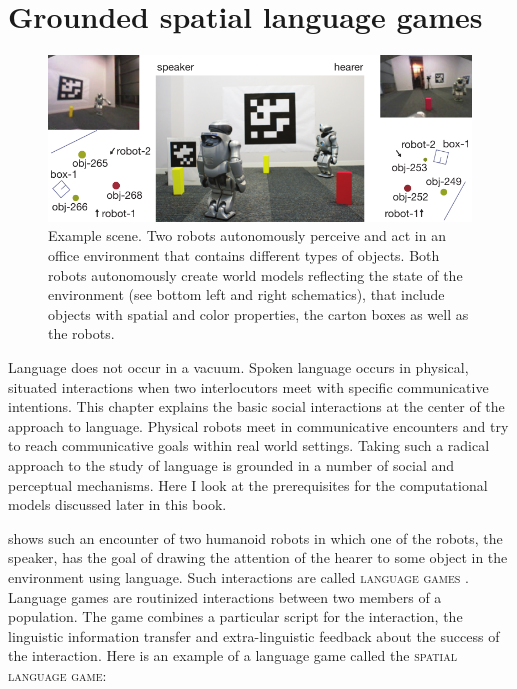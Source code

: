 %


\chapter{Grounded spatial language games}
\label{s:spatial-language-games}
\begin{figure}
\begin{center}
\includegraphics[width=1.0\columnwidth]{figs/space-scene-2-small}
\end{center}
\caption[Example spatial setup]{Example scene. 
Two robots autonomously perceive and act in an office 
environment that contains different types of objects. Both 
robots autonomously create world models reflecting the state 
of the environment (see bottom left and right schematics), that 
include objects with spatial and color properties, the carton boxes 
as well as the robots.}
\label{f:scene}
\end{figure}

\noindent Language does not occur in a vacuum. Spoken language occurs in physical,
situated interactions when two interlocutors meet with specific
communicative intentions. This chapter explains the basic social interactions 
at the center of the approach to language. Physical robots meet in communicative
encounters and try to reach communicative goals within real world settings. 
Taking such a radical approach to the study of language is grounded in a number of
social and perceptual mechanisms. Here I look at the prerequisites for 
the computational models discussed later in this book.

 shows such an encounter of
two humanoid robots in which one of the robots, the speaker, has the goal
of drawing the attention of the hearer to some object in the environment using language.
Such interactions are called \textsc{language games} \citep{steels2001language}.
Language games are routinized interactions between two members of 
a population. The game combines a particular script for the interaction, the linguistic
information transfer and extra-linguistic feedback about the success of the interaction.
Here is an example of a language game called the \textsc{spatial language game}:


